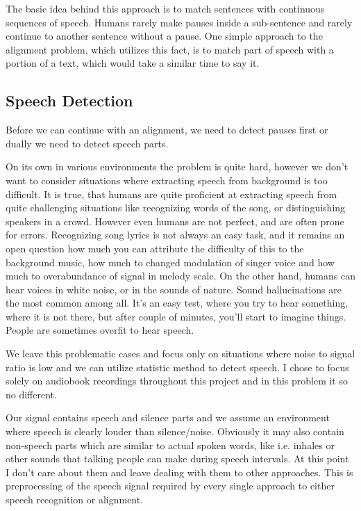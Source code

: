 \documentclass[12pt,a4paper,english]{article}
\begin{document}
The basic idea behind this approach is to match sentences with continuous sequences of speech.
Humans rarely make pauses inside a sub-sentence and rarely continue to another sentence without a pause. \newline
One simple approach to the alignment problem, which utilizes this fact, is to match part of speech with a portion of a text,
which would take a similar time to say it. \newline \newline

\subsection{Speech Detection}

Before we can continue with an alignment, we need to detect pauses first or dually we need to detect speech parts. \newline

On its own in various environments  the problem is quite hard, however we don't want to consider situations where extracting speech from background is too difficult. It is true, that humans are quite proficient at extracting speech from quite challenging situations like recognizing words of the song, or distinguishing speakers in a crowd.
However even humans are not perfect, and are often prone for errors. Recognizing song lyrics is not always an easy task, and it remains an open question how much you can attribute the difficulty of this to the background music, how much to changed modulation of singer voice and how much to overabundance of signal in melody scale.
On the other hand, humans can hear voices in white noise, or in the sounds of nature. Sound hallucinations are the most common among all. It's an easy test, where you try to hear something, where it is not there, but after couple of minutes, you'll start to imagine things. People are sometimes overfit to hear speech. \newline

We leave this problematic cases and focus only on situations where noise to signal ratio is low and we can utilize statistic method to detect speech.
I chose to focus solely on audiobook recordings throughout this project and in this problem it so no different.\newline

Our signal contains speech and silence parts and we assume an environment where speech is clearly louder than silence/noise. Obviously it may also contain non-speech parts which are similar to actual spoken words, like i.e. inhales or other sounds that talking people can make during speech intervals. At this point I don't care about them and leave dealing with them to other approaches. \newline
This is preprocessing of the speech signal required by every single approach to either speech recognition or alignment. 
\end{document}
